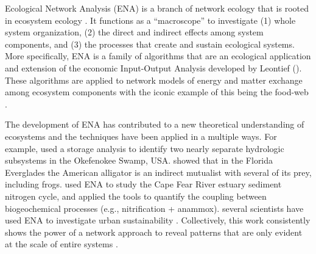 \documentclass[11pt]{article}
\begin{document}
\begin{spacing}{2}
Ecological Network Analysis (ENA) is a branch of network ecology that
is rooted in ecosystem ecology \citep{borrett12_netecol}.  It functions
as a ``macroscope'' to investigate (1) whole system organization,
(2) the direct and indirect effects among system components, and (3)
the processes that create and sustain ecological systems.  More
specifically, ENA is a family of algorithms that are an ecological
application and extension of the economic Input-Output Analysis
developed by Leontief (\citeyear{leontief66}).  These algorithms are
applied to network models of energy and matter exchange among
ecosystem components with the iconic example of this being the
food-web \citep{patten76, ulanowicz86, fath99_review, hannon73}.

The development of ENA has contributed to a new theoretical
understanding of ecosystems \citep{ulanowicz86, higashi91, belgrano05,
  jorgensen07_newecology} and the techniques have been applied in a
multiple ways.  For example, \citet{patten82} used a storage analysis
to identify two nearly separate hydrologic subsystems in the
Okefenokee Swamp, USA.  \citet{bondavalli99} showed that in the
Florida Everglades the American alligator is an indirect mutualist
with several of its prey, including frogs.  \citet{hines12} used
ENA to study the Cape Fear River estuary sediment nitrogen cycle, and applied
the tools to quantify the coupling between biogeochemical processes
(e.g., nitrification + anammox).  
several scientists have used ENA to investigate urban sustainability
\citep{bodini02, zhang10_ecomod, chen12, bodini2012cities}.
Collectively, this work consistently shows the power of a network
approach to reveal patterns that are only evident at the scale of
entire systems \citep{ulanowicz90, patten91, fath07_netconstruction}.


\end{spacing}
\end{document}
